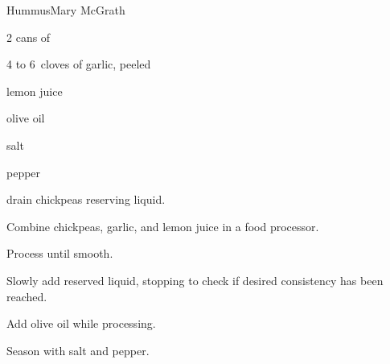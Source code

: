 \begin{recipe}{Hummus}{Mary McGrath}{\C{3\half}}

\begin{ingredients}
\item 2  cans of 
\item 4 to 6~cloves of garlic, peeled
\item \C{\quarter} lemon juice
\item \C{\third} olive oil
\item salt
\item pepper
\end{ingredients}

\begin{directions}
\item drain chickpeas reserving liquid.
\item Combine chickpeas, garlic, and lemon juice in a food processor.
\item Process until smooth.
\item Slowly add reserved liquid, stopping to check if desired consistency has been reached.
\item Add olive oil while processing.
\item Season with salt and pepper.
\end{directions}

\end{recipe}

